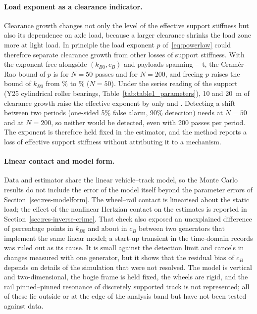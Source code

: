 \paragraph{Load exponent as a clearance indicator.} Clearance growth changes not only the level of the
effective support stiffness but also its dependence on axle load, because a larger clearance shrinks
the load zone more at light load. In principle the load exponent $p$ of~\eqref{eq:powerlaw} could
therefore separate clearance growth from other losses of support stiffness. With the exponent free
alongside $(k_{B0}, c_B)$ and payloads spanning \PayloadMin--\PayloadMax~t, the Cram\'er--Rao bound of
$p$ is \ExpCRBFifty{} for $N = 50$ passes and \ExpCRBTwoHundred{} for $N = 200$, and freeing $p$ raises
the bound of $k_{B0}$ from \KBCRBExpFixed\% to \KBCRBExpFree\% ($N=50$). Under the series reading of
the support (Y25 cylindrical roller bearings, Table~\ref{tab:table1_parameters}), 10 and 20~\textmu m of clearance growth raise the
effective exponent by only \ExpShiftTen{} and \ExpShiftTwenty{}. Detecting a shift between two
periods (one-sided 5\% false alarm, 90\% detection) needs \ExpMDCFifty{} at $N=50$ and
\ExpMDCTwoHundred{} at $N=200$, so neither would be detected, even with 200 passes per period. The exponent is
therefore held fixed in the estimator, and the method reports a loss of effective support stiffness
without attributing it to a mechanism.

\paragraph{Linear contact and model form.} Data and estimator share the linear vehicle--track model, so
the Monte Carlo results do not include the error of the model itself beyond the parameter errors of
Section~\ref{sec:res-modelform}. The wheel--rail contact is linearised about the static load; the
effect of the nonlinear Hertzian contact on the estimates is reported in
Section~\ref{sec:res-inverse-crime}. That check also exposed an unexplained difference of
\GenkB{} percentage points in $k_{B0}$ and about \GencB{} in $c_B$ between two generators that implement
the same linear model; a start-up transient in the time-domain records was ruled out as its cause. It is
small against the detection limit and cancels in changes measured with one generator, but it shows that the residual bias of $c_B$ depends on details of the simulation that
were not resolved. The model is vertical and two-dimensional, the bogie frame is
held fixed, the wheels are rigid, and the rail pinned--pinned resonance of discretely supported track
is not represented; all of these lie outside or at the edge of the analysis band but have not been
tested against data.


